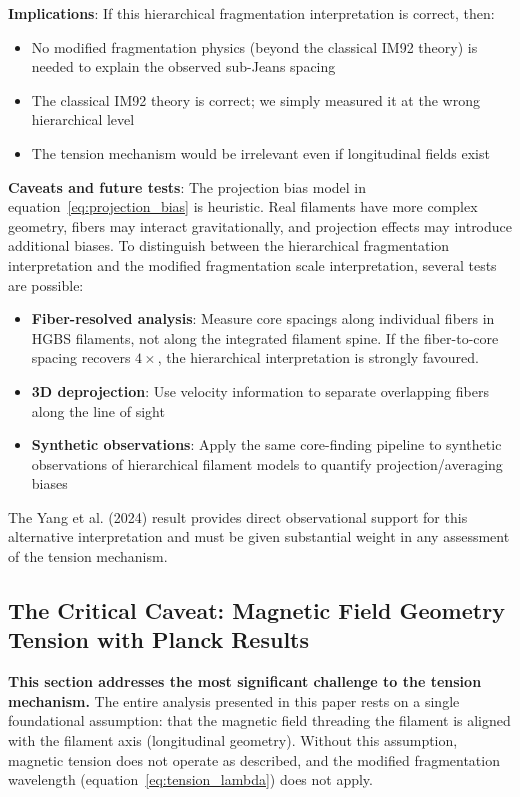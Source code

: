\documentclass[11pt,a4paper]{article}
\begin{document}
\textbf{Implications}: If this hierarchical fragmentation interpretation is correct, then:
\begin{itemize}
    \item No modified fragmentation physics (beyond the classical IM92 theory) is needed to explain the observed sub-Jeans spacing
    \item The classical IM92 theory is correct; we simply measured it at the wrong hierarchical level
    \item The tension mechanism would be irrelevant even if longitudinal fields exist
\end{itemize}

\textbf{Caveats and future tests}: The projection bias model in equation~\ref{eq:projection_bias} is heuristic. Real filaments have more complex geometry, fibers may interact gravitationally, and projection effects may introduce additional biases. To distinguish between the hierarchical fragmentation interpretation and the modified fragmentation scale interpretation, several tests are possible:
\begin{itemize}
    \item \textbf{Fiber-resolved analysis}: Measure core spacings along individual fibers in HGBS filaments, not along the integrated filament spine. If the fiber-to-core spacing recovers $4\times$, the hierarchical interpretation is strongly favoured.
    \item \textbf{3D deprojection}: Use velocity information to separate overlapping fibers along the line of sight
    \item \textbf{Synthetic observations}: Apply the same core-finding pipeline to synthetic observations of hierarchical filament models to quantify projection/averaging biases
\end{itemize}

The Yang et al. (2024) result provides direct observational support for this alternative interpretation and must be given substantial weight in any assessment of the tension mechanism.

\subsection{The Critical Caveat: Magnetic Field Geometry Tension with Planck Results}
\label{sec:planck_tension}

\textbf{This section addresses the most significant challenge to the tension mechanism.} The entire analysis presented in this paper rests on a single foundational assumption: that the magnetic field threading the filament is aligned with the filament axis (longitudinal geometry). Without this assumption, magnetic tension does not operate as described, and the modified fragmentation wavelength (equation~\ref{eq:tension_lambda}) does not apply.
\end{document}
